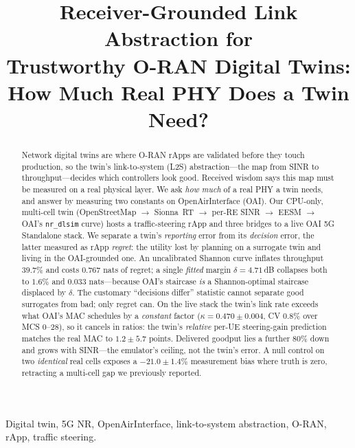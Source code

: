 \documentclass[conference]{IEEEtran}
\begin{document}
\title{Receiver-Grounded Link Abstraction for\\Trustworthy O-RAN Digital Twins:\\How Much Real PHY Does a Twin Need?}

\author{\IEEEauthorblockN{}%
\IEEEauthorblockA{}}

\maketitle
{}

\begin{abstract}
Network digital twins are where O-RAN rApps are validated before they touch production, so the twin's link-to-system (L2S) abstraction---the map from SINR to throughput---decides which controllers look good. Received wisdom says this map must be measured on a real physical layer. We ask \emph{how much} of a real PHY a twin needs, and answer by measuring two constants on OpenAirInterface (OAI). Our CPU-only, multi-cell twin (OpenStreetMap $\to$ Sionna~RT $\to$ per-RE SINR $\to$ EESM $\to$ OAI's \texttt{nr\_dlsim} curve) hosts a traffic-steering rApp and three bridges to a live OAI 5G Standalone stack. We separate a twin's \emph{reporting} error from its \emph{decision} error, the latter measured as rApp \emph{regret}: the utility lost by planning on a surrogate twin and living in the OAI-grounded one. An uncalibrated Shannon curve inflates throughput $39.7\%$ and costs $0.767$ nats of regret; a single \emph{fitted} margin $\delta{=}4.71$\,dB collapses both to $1.6\%$ and $0.033$ nats---because OAI's staircase \emph{is} a Shannon-optimal staircase displaced by $\delta$. The customary ``decisions differ'' statistic cannot separate good surrogates from bad; only regret can. On the live stack the twin's link rate exceeds what OAI's MAC schedules by a \emph{constant} factor ($\kappa{=}0.470\pm0.004$, CV $0.8\%$ over MCS 0--28), so it cancels in ratios: the twin's \emph{relative} per-UE steering-gain prediction matches the real MAC to $1.2\pm5.7$ points. Delivered goodput lies a further $80\%$ down and grows with SINR---the emulator's ceiling, not the twin's error. A null control on two \emph{identical} real cells exposes a $-21.0\pm1.4\%$ measurement bias where truth is zero, retracting a multi-cell gap we previously reported.
\end{abstract}

\begin{IEEEkeywords}
Digital twin, 5G NR, OpenAirInterface, link-to-system abstraction, O-RAN, rApp, traffic steering.
\end{IEEEkeywords}
\end{document}
